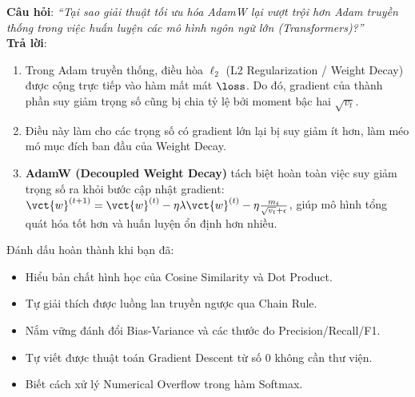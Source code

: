 \begin{interviewbox}
\textbf{Câu hỏi}: \textit{``Tại sao giải thuật tối ưu hóa AdamW lại vượt trội hơn Adam truyền thống trong việc huấn luyện các mô hình ngôn ngữ lớn (Transformers)?''}\\
\textbf{Trả lời}:
\begin{enumerate}
  \item Trong Adam truyền thống, điều hòa $\ell_2$ (L2 Regularization / Weight Decay) được cộng trực tiếp vào hàm mất mát $\loss$. Do đó, gradient của thành phần suy giảm trọng số cũng bị chia tỷ lệ bởi moment bậc hai $\sqrt{v_t}$.
  \item Điều này làm cho các trọng số có gradient lớn lại bị suy giảm ít hơn, làm méo mó mục đích ban đầu của Weight Decay.
  \item \textbf{AdamW (Decoupled Weight Decay)} tách biệt hoàn toàn việc suy giảm trọng số ra khỏi bước cập nhật gradient: $\vct{w}^{(t+1)} = \vct{w}^{(t)} - \eta \lambda \vct{w}^{(t)} - \eta \frac{m_t}{\sqrt{v_t} + \epsilon}$, giúp mô hình tổng quát hóa tốt hơn và huấn luyện ổn định hơn nhiều.
\end{enumerate}
\end{interviewbox}

\begin{checkpointbox}
Đánh dấu hoàn thành khi bạn đã:
\begin{itemize}
  \item[$\square$] Hiểu bản chất hình học của Cosine Similarity và Dot Product.
  \item[$\square$] Tự giải thích được luồng lan truyền ngược qua Chain Rule.
  \item[$\square$] Nắm vững đánh đổi Bias-Variance và các thước đo Precision/Recall/F1.
  \item[$\square$] Tự viết được thuật toán Gradient Descent từ số 0 không cần thư viện.
  \item[$\square$] Biết cách xử lý Numerical Overflow trong hàm Softmax.
\end{itemize}
\end{checkpointbox}
